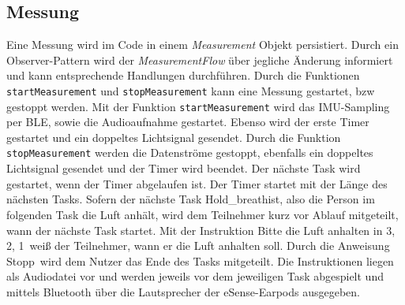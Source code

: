 \subsection{Messung}
\label{ch:Implementierung:app:measurement}
Eine Messung wird im Code in einem \textit{Measurement} Objekt persistiert.
Durch ein Observer-Pattern wird der \textit{MeasurementFlow} über jegliche Änderung informiert und kann entsprechende Handlungen durchführen.
Durch die Funktionen \texttt{startMeasurement} und \texttt{stopMeasurement} kann eine Messung gestartet, bzw gestoppt werden.
Mit der Funktion \texttt{startMeasurement} wird das IMU-Sampling per BLE, sowie die Audioaufnahme gestartet. 
Ebenso wird der erste Timer gestartet und ein doppeltes Lichtsignal gesendet. 
Durch die Funktion \texttt{stopMeasurement} werden die Datenströme gestoppt, ebenfalls ein doppeltes Lichtsignal gesendet und der Timer wird beendet.
Der nächste Task wird gestartet, wenn der Timer abgelaufen ist. Der Timer startet mit der Länge des nächsten Tasks.
Sofern der nächste Task \glqq Hold\_breath\grqq ist, also die Person im folgenden Task die Luft anhält, wird dem Teilnehmer kurz vor Ablauf mitgeteilt, wann der nächste Task startet.
Mit der Instruktion \glqq Bitte die Luft anhalten in 3, 2, 1\grqq \ weiß der Teilnehmer, wann er die Luft anhalten soll.
Durch die Anweisung \glqq Stopp\grqq \ wird dem Nutzer das Ende des Tasks mitgeteilt. 
Die Instruktionen liegen als Audiodatei vor und werden jeweils vor dem jeweiligen Task abgespielt und mittels Bluetooth über die Lautsprecher der eSense-Earpods ausgegeben.


